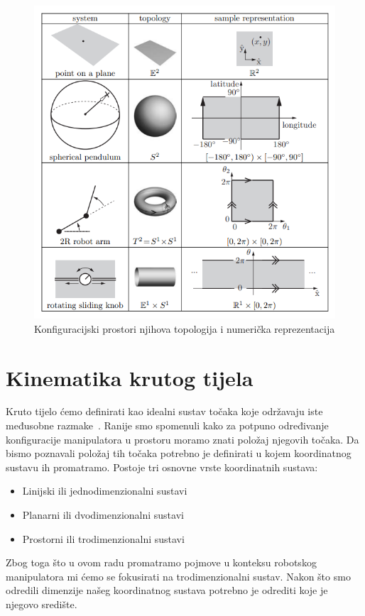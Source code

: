 \documentclass[times, utf8, diplomskirad]{fer}
\begin{document}
\begin{figure}[H]
    \centering
    \includegraphics[width=12cm]{img/configuration-topology}
    \caption{Konfiguracijski prostori njihova topologija i numerička reprezentacija}
    \label{fig:configuration-topology}
\end{figure}

\section{Kinematika krutog tijela}
Kruto tijelo ćemo definirati kao idealni sustav točaka koje održavaju iste međusobne razmake~\cite{defKrutogTijela}.
Ranije smo spomenuli kako za potpuno određivanje konfiguracije manipulatora u prostoru moramo znati položaj njegovih točaka.
Da bismo poznavali položaj tih točaka potrebno je definirati u kojem koordinatnog sustavu ih promatramo.
Postoje tri osnovne vrste koordinatnih sustava:
\begin{itemize}
  \item Linijski ili jednodimenzionalni sustavi
  \item Planarni ili dvodimenzionalni sustavi
  \item Prostorni ili trodimenzionalni sustavi
\end{itemize}
\newpage
Zbog toga što u ovom radu promatramo pojmove u konteksu robotskog manipulatora mi ćemo se fokusirati na trodimenzionalni sustav.
Nakon što smo odredili dimenzije našeg koordinatnog sustava potrebno je odrediti koje je njegovo središte.
\end{document}
